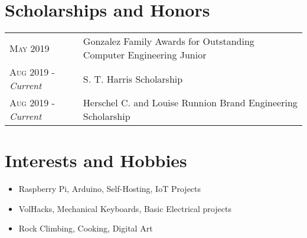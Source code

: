\documentclass[a4paper,11pt]{article}
\begin{document}
\section{Scholarships and Honors}
\begin{tabularx}{\textwidth}{lX}
   \textsc{May 2019} & Gonzalez Family Awards for Outstanding Computer Engineering Junior\\
   \textsc{Aug 2019} \-- \emph{Current} & S. T. Harris Scholarship\\
   \textsc{Aug 2019} \-- \emph{Current} & Herschel C. and Louise Runnion Brand Engineering Scholarship\\
\end{tabularx}

\section{Interests and Hobbies}
\begin{itemize}[topsep=1pt,itemsep=0pt,partopsep=1pt, parsep=1pt]
   \item Raspberry Pi, Arduino, Self-Hosting, IoT Projects
   \item VolHacks, Mechanical Keyboards, Basic Electrical projects
   \item Rock Climbing, Cooking, Digital Art %
\end{itemize}
\end{document}
